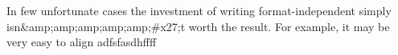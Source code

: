 
In few unfortunate cases the investment of writing format-independent \latex simply isn&amp;amp;amp;amp;amp;#x27;t worth the result. For example, it may be very easy to align adfsfasdhffff